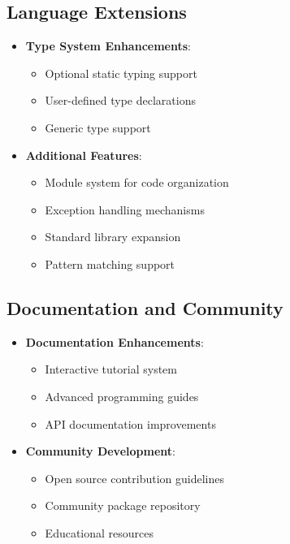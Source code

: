 \documentclass[conference]{IEEEtran}
\begin{document}
\subsection{Language Extensions}
\begin{itemize}
    \item \textbf{Type System Enhancements}:
    \begin{itemize}
        \item Optional static typing support
        \item User-defined type declarations
        \item Generic type support
    \end{itemize}
    
    \item \textbf{Additional Features}:
    \begin{itemize}
        \item Module system for code organization
        \item Exception handling mechanisms
        \item Standard library expansion
        \item Pattern matching support
    \end{itemize}
\end{itemize}

\subsection{Documentation and Community}
\begin{itemize}
    \item \textbf{Documentation Enhancements}:
    \begin{itemize}
        \item Interactive tutorial system
        \item Advanced programming guides
        \item API documentation improvements
    \end{itemize}
    
    \item \textbf{Community Development}:
    \begin{itemize}
        \item Open source contribution guidelines
        \item Community package repository
        \item Educational resources
    \end{itemize}
\end{itemize}
\end{document}
